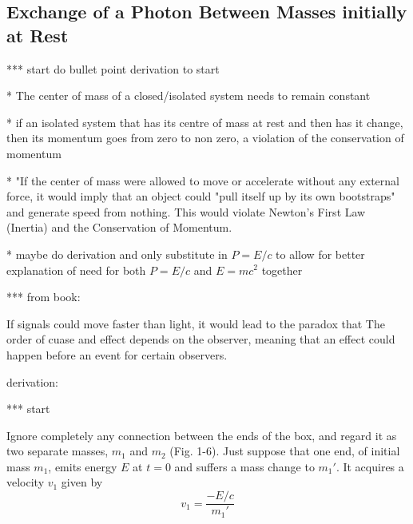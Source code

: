 \subsection{Exchange of a Photon Between Masses initially at Rest}\label{subsect: Exchange of a Photon Between Masses initially at Rest}

*** start do bullet point derivation to start

* The center of mass of a closed/isolated system needs to remain constant

* if an isolated system that has its centre of mass at rest and then has it change, then its momentum goes from zero to non zero, a violation of the conservation of momentum

* "If the center of mass were allowed to move or accelerate without any external force, it would imply that an object could "pull itself up by its own bootstraps" and generate speed from nothing. This would violate Newton’s First Law (Inertia) and the Conservation of Momentum.

* maybe do derivation and only substitute in $P=E/c$ to allow for better explanation of need for both $P=E/c$ and $E=mc^2$ together

*** from book:

If signals could move faster than light, it would lead to the paradox that The order of cuase and effect depends on the observer, meaning that an effect could happen before an event for certain observers.

derivation:

*** start

Ignore completely any connection between the ends of the box, and regard it as two separate masses, $m_1$ and $m_2$ (Fig. 1-6). Just suppose that one end, of initial mass $m_1$, emits energy $E$ at $t = 0$ and suffers a mass change to $m_1'$. It acquires a velocity $v_1$ given by
\[
v_1 = \frac{-E/c}{m_1'}
\]

